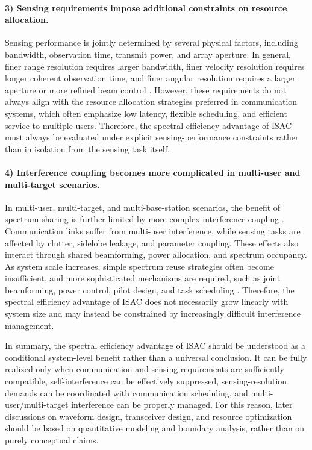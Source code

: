 \paragraph{3) Sensing requirements impose additional constraints on resource allocation.}
Sensing performance is jointly determined by several physical factors, including bandwidth, observation time, transmit power, and array aperture. In general, finer range resolution requires larger bandwidth, finer velocity resolution requires longer coherent observation time, and finer angular resolution requires a larger aperture or more refined beam control \cite{Richards2014,SkolnikRadarBook}. However, these requirements do not always align with the resource allocation strategies preferred in communication systems, which often emphasize low latency, flexible scheduling, and efficient service to multiple users. Therefore, the spectral efficiency advantage of ISAC must always be evaluated under explicit sensing-performance constraints rather than in isolation from the sensing task itself.

\paragraph{4) Interference coupling becomes more complicated in multi-user and multi-target scenarios.}
In multi-user, multi-target, and multi-base-station scenarios, the benefit of spectrum sharing is further limited by more complex interference coupling \cite{Liu2022ISAC,Cui2024integrated}. Communication links suffer from multi-user interference, while sensing tasks are affected by clutter, sidelobe leakage, and parameter coupling. These effects also interact through shared beamforming, power allocation, and spectrum occupancy. As system scale increases, simple spectrum reuse strategies often become insufficient, and more sophisticated mechanisms are required, such as joint beamforming, power control, pilot design, and task scheduling \cite{Liu2020JointRadarComm,Gonzalez2024integrated}. Therefore, the spectral efficiency advantage of ISAC does not necessarily grow linearly with system size and may instead be constrained by increasingly difficult interference management.

In summary, the spectral efficiency advantage of ISAC should be understood as a conditional system-level benefit rather than a universal conclusion. It can be fully realized only when communication and sensing requirements are sufficiently compatible, self-interference can be effectively suppressed, sensing-resolution demands can be coordinated with communication scheduling, and multi-user/multi-target interference can be properly managed. For this reason, later discussions on waveform design, transceiver design, and resource optimization should be based on quantitative modeling and boundary analysis, rather than on purely conceptual claims.

